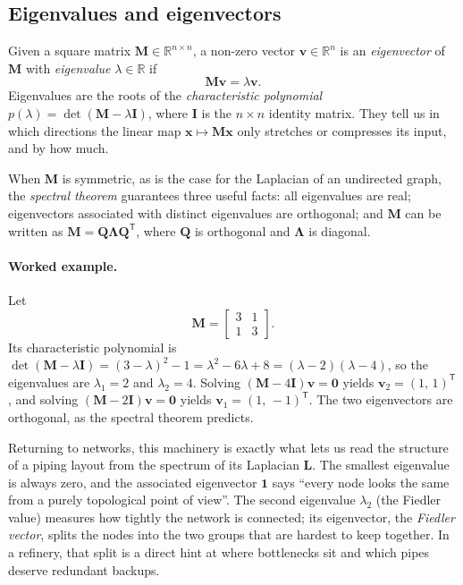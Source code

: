 \documentclass[11pt,a4paper]{article}
\newcommand{\RR}{\mathbb{R}}
\newcommand{\mat}[1]{\mathbf{#1}}
\newcommand{\vect}[1]{\mathbf{#1}}
\newcommand{\transpose}{^{\mathsf{T}}}
\begin{document}
\subsection{Eigenvalues and eigenvectors}
\label{sec:eigen}

Given a square matrix $\mat{M} \in \RR^{n \times n}$, a non-zero vector
$\vect{v} \in \RR^{n}$ is an \emph{eigenvector} of $\mat{M}$ with
\emph{eigenvalue} $\lambda \in \RR$ if
\begin{equation}
  \mat{M}\vect{v} = \lambda \vect{v}.
  \label{eq:eigendef}
\end{equation}
Eigenvalues are the roots of the \emph{characteristic polynomial}
$p(\lambda) = \det(\mat{M} - \lambda \mat{I})$, where $\mat{I}$ is the
$n \times n$ identity matrix. They tell us in which directions the
linear map $\vect{x} \mapsto \mat{M}\vect{x}$ only stretches or
compresses its input, and by how much.

When $\mat{M}$ is symmetric, as is the case for the Laplacian of an
undirected graph, the \emph{spectral theorem} guarantees three useful
facts: all eigenvalues are real; eigenvectors associated with distinct
eigenvalues are orthogonal; and $\mat{M}$ can be written as
$\mat{M} = \mat{Q}\mat{\Lambda}\mat{Q}\transpose$, where $\mat{Q}$ is
orthogonal and $\mat{\Lambda}$ is diagonal.

\paragraph{Worked example.}
Let
\[
\mat{M} = \begin{bmatrix} 3 & 1 \\ 1 & 3 \end{bmatrix}.
\]
Its characteristic polynomial is
$\det(\mat{M} - \lambda \mat{I}) = (3 - \lambda)^2 - 1
= \lambda^2 - 6\lambda + 8 = (\lambda - 2)(\lambda - 4)$, so the
eigenvalues are $\lambda_1 = 2$ and $\lambda_2 = 4$. Solving
$(\mat{M} - 4\mat{I})\vect{v} = \vect{0}$ yields
$\vect{v}_2 = (1,\, 1)\transpose$, and solving
$(\mat{M} - 2\mat{I})\vect{v} = \vect{0}$ yields
$\vect{v}_1 = (1,\, -1)\transpose$. The two eigenvectors are orthogonal,
as the spectral theorem predicts.

Returning to networks, this machinery is exactly what lets us read the
structure of a piping layout from the spectrum of its Laplacian
$\mat{L}$. The smallest eigenvalue is always zero, and the associated
eigenvector $\vect{1}$ says ``every node looks the same from a purely
topological point of view''. The second eigenvalue $\lambda_2$ (the
Fiedler value) measures how tightly the network is connected; its
eigenvector, the \emph{Fiedler vector}, splits the nodes into the two
groups that are hardest to keep together. In a refinery, that split is
a direct hint at where bottlenecks sit and which pipes deserve
redundant backups.
\end{document}
